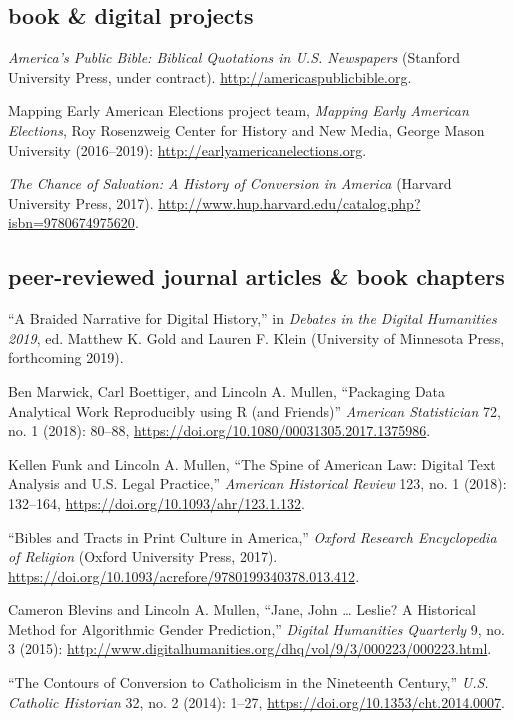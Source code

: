 \documentclass[11pt]{article}
\begin{document}
\subsection{book \& digital projects}\label{books}

\emph{America's Public Bible: Biblical Quotations in U.S. Newspapers} 
(Stanford University Press, under contract). 
\url{http://americaspublicbible.org}.

Mapping Early American Elections project team, \emph{Mapping Early American Elections}, Roy Rosenzweig Center 
for History and New Media, George Mason University (2016--2019): 
\url{http://earlyamericanelections.org}.

\emph{The Chance of Salvation: A History of Conversion in America} (Harvard 
University Press, 2017). 
\url{http://www.hup.harvard.edu/catalog.php?isbn=9780674975620}.

\subsection{peer-reviewed journal articles \& book chapters}\label{peer-reviewed}

``A Braided Narrative for Digital History,'' in \emph{Debates in the Digital Humanities 2019}, ed. Matthew K. Gold and Lauren F. Klein (University of Minnesota Press, forthcoming 2019).

Ben Marwick, Carl Boettiger, and Lincoln A. Mullen, ``Packaging Data 
Analytical Work Reproducibly using R (and Friends)'' \emph{American 
Statistician} 72, no. 1 (2018): 80--88, \url{https://doi.org/10.1080/00031305.2017.1375986}.

Kellen Funk and Lincoln A. Mullen, ``The Spine of American Law: Digital Text Analysis and U.S. Legal Practice,'' \emph{American Historical Review} 123, no.  1 (2018): 132--164, \url{https://doi.org/10.1093/ahr/123.1.132}.

``Bibles and Tracts in Print Culture in America,'' \emph{Oxford Research Encyclopedia of Religion} (Oxford University Press, 2017). \url{ https://doi.org/10.1093/acrefore/9780199340378.013.412}.

Cameron Blevins and Lincoln A. Mullen, ``Jane, John \ldots{} Leslie? A Historical Method for Algorithmic Gender Prediction,'' \emph{Digital Humanities Quarterly} 9, no. 3 (2015): \url{http://www.digitalhumanities.org/dhq/vol/9/3/000223/000223.html}.

``The Contours of Conversion to Catholicism in the Nineteenth Century,'' \emph{U.S. Catholic Historian} 32, no. 2 (2014): 1--27, \url{https://doi.org/10.1353/cht.2014.0007}.
\end{document}
